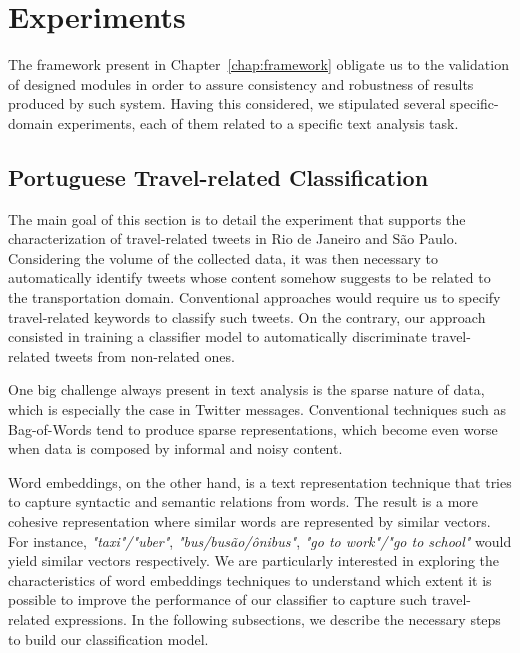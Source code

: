 \chapter{Experiments} \label{chap:experiments}

\minitoc \mtcskip \noindent

The framework present in Chapter~\ref{chap:framework} obligate us to the validation of designed modules in order to assure consistency and robustness of results produced by such system. Having this considered, we stipulated several specific-domain experiments, each of them related to a specific text analysis task.

\section{Portuguese Travel-related Classification}\label{sec:travel_related_classification}
The main goal of this section is to detail the experiment that supports the characterization of travel-related tweets in Rio de Janeiro and São Paulo. Considering the volume of the collected data, it was then necessary to automatically identify tweets whose content somehow suggests to be related to the transportation domain. Conventional approaches would require us to specify travel-related keywords to classify such tweets. On the contrary, our approach consisted in training a classifier model to automatically discriminate travel-related tweets from non-related ones. 

One big challenge always present in text analysis is the sparse nature of data, which is especially the case in Twitter messages.
Conventional techniques such as Bag-of-Words tend to produce sparse representations, which become even worse when data is composed by informal and noisy content.

Word embeddings, on the other hand, is a text representation technique that tries to capture syntactic and semantic relations from words. The result is a more cohesive representation where similar words are represented by similar vectors. For instance, \emph{"taxi"/"uber"}, \emph{"bus/busão/ônibus"}, \emph{"go to work"/"go to school"} would yield similar vectors respectively.
We are particularly interested in exploring the characteristics of word embeddings techniques to understand which extent it is possible to improve the performance of our classifier to capture such travel-related expressions. In the following subsections, we describe the necessary steps to build our classification model.

